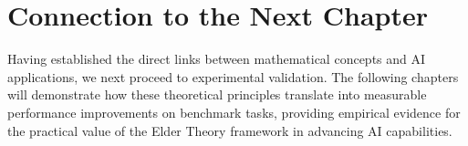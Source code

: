 \section{Connection to the Next Chapter}

Having established the direct links between mathematical concepts and AI applications, we next proceed to experimental validation. The following chapters will demonstrate how these theoretical principles translate into measurable performance improvements on benchmark tasks, providing empirical evidence for the practical value of the Elder Theory framework in advancing AI capabilities.